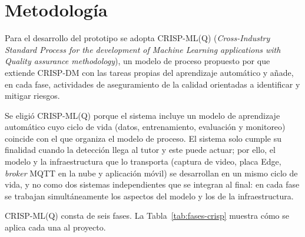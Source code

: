 \documentclass[12pt,a4paper,oneside]{book}
\theoremstyle{plain}
\theoremstyle{definition}
\theoremstyle{remark}
\begin{document}

\section{Metodología}
\label{sec:metodologia}

Para el desarrollo del prototipo se adopta CRISP-ML(Q) (\textit{Cross-Industry Standard Process for the development of Machine Learning applications with Quality assurance methodology}), un modelo de proceso propuesto por \textcite{studer2021crispmlq} que extiende CRISP-DM con las tareas propias del aprendizaje automático y añade, en cada fase, actividades de aseguramiento de la calidad orientadas a identificar y mitigar riesgos.

Se eligió CRISP-ML(Q) porque el sistema incluye un modelo de aprendizaje automático cuyo ciclo de vida (datos, entrenamiento, evaluación y monitoreo) coincide con el que organiza el modelo de proceso. El sistema solo cumple su finalidad cuando la detección llega al tutor y este puede actuar; por ello, el modelo y la infraestructura que lo transporta (captura de video, placa Edge, \textit{broker} MQTT en la nube y aplicación móvil) se desarrollan en un mismo ciclo de vida, y no como dos sistemas independientes que se integran al final: en cada fase se trabajan simultáneamente los aspectos del modelo y los de la infraestructura.

CRISP-ML(Q) consta de seis fases. La Tabla~\ref{tab:fases-crisp} muestra cómo se aplica cada una al proyecto.
\end{document}
